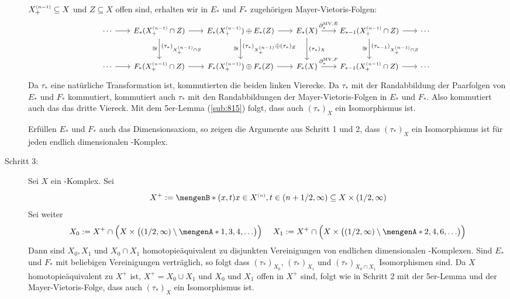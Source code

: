 \begin{description}
	$X^{\scriptscriptstyle(n-1)}_+ \subseteq X$ und $Z \subseteq X$ offen sind, erhalten wir in $E_*$ und $F_*$ zugehörigen Mayer-Vietoris-Folgen:
	\[
		\!\!\begin{tikzcd}[column sep=1.8em, row sep=2.5em,font=\small]
			\cdots \rar & E_* \enbrace{X_+^\ssbrace{n-1} \cap Z} \rar \dar["(\tau_*)_{X_+^\ssbrace{n-1} \cap Z}","\cong"']
			& E_*\enbrace{X_+^\ssbrace{n-1}} \oplus E_*(Z) \rar \dar["(\tau_*)_{X_+^\ssbrace{n-1}} \oplus (\tau_*)_{Z}","\cong"']
			& E_*(X) \rar["\partial_*^{\mathrm{MV},E}"] \dar["(\tau_*)_X"]
			& E_{*-1} \enbrace{X_+^\ssbrace{n-1} \cap Z} \rar \dar["(\tau_{*-1})_{X_+^\ssbrace{n-1} \cap Z}", "\cong"'] & \cdots  \\
			\cdots \rar & F_* \enbrace{X_+^\ssbrace{n-1} \cap Z} \rar & F_*\enbrace{X_+^\ssbrace{n-1}} \oplus F_*(Z) \rar 
			& F_*(X) \rar["\partial_*^{\mathrm{MV},F}"] & F_{*-1} \enbrace{X_+^\ssbrace{n-1} \cap Z} \rar & \cdots
		\end{tikzcd}
	\]
	Da $\tau_*$ eine natürliche Transformation ist, kommutierten die beiden linken Vierecke. Da $\tau_*$ mit der Randabbildung der Paarfolgen von $E_*$ und $F_*$ 
	kommutiert, kommutiert auch $\tau_*$ mit den Randabbildungen der Mayer-Vietoris-Folgen in $E_*$ und $F_*$. Also kommutiert auch das das dritte Viereck. Mit dem 
	5er-Lemma (\ref{sub:815}) folgt, dass auch $(\tau_*)_X$ ein Isomorphismus ist.
	
	Erfüllen $E_*$ und $F_*$ auch das Dimensionsaxiom, so zeigen die Argumente aus Schritt 1 und 2, dass $(\tau_*)_X$ ein Isomorphismus ist für jeden endlich dimensionalen
	\CW-Komplex.
	\item[Schritt 3:] Sei $X$ ein \CW-Komplex. Sei
	\[
		X^+ := \set[(x,t)]{x \in X^\ssbrace{n}, t \in \enbrace*{n+ 1/2,\infty}\rule{0cm}{1em}} \subseteq X \times \enbrace*{1/2 ,\infty}
	\]
	Sei weiter
	\[
		X_0 := X^+ \cap \enbrace[\Big]{X \times \enbrace[\big]{(1/2,\infty) \setminus \set{1,3,4,\ldots } } } \quad \,\,
		X_1 := X^+ \cap \enbrace[\Big]{X \times \enbrace[\big]{(1/2,\infty) \setminus \set{2,4,6,\ldots } } } 
	\]
	Dann sind $X_0,X_1$ und $X_0 \cap X_1$ homotopieäquivalent zu disjunkten Vereinigungen von endlichen dimensionalen \CW-Komplexen. Sind $E_*$ und $F_*$ mit beliebigen
	Vereinigungen verträglich, so folgt dass $(\tau_*)_{X_0}$, $(\tau_*)_{X_1}$ und $(\tau_*)_{X_0\cap X_1}$ Isomorphismen sind. Da $X$ homotopieäquivalent zu $X^+$ ist,
	$X^+ =X_0 \cup X_1$ und $X_0$ und $X_1$ offen in $X^+$ sind, folgt wie in Schritt 2 mit der 5er-Lemma und der Mayer-Vietoris-Folge, dass auch $(\tau_*)_X$ ein 
	Isomorphismus ist. \bewende
\end{description}
\newpage
